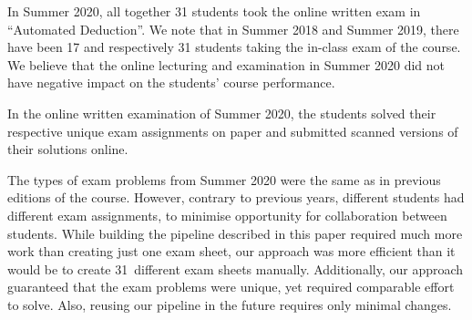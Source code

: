 In Summer 2020, all together 31 students took the online written exam
in ``Automated Deduction''. We note that in Summer 2018 and Summer
2019, there have been 17 and respectively 31 students taking
the in-class exam of the course. We believe that the
online lecturing and examination in Summer 2020 did not have negative
impact on the students' course performance.

In the online written examination of Summer 2020, the  students solved
their respective unique exam assignments on paper and submitted
scanned versions of their
solutions online. 

The types of exam problems from Summer 2020  were the same as in
previous editions of the course. 
However, contrary to previous years, different students had different exam
assignments, to minimise opportunity for collaboration between students.
%
While building the pipeline described in this paper required much more work
than creating just one exam sheet, our approach was more efficient than
it would be to create 31~different exam sheets manually. Additionally,
our approach guaranteed that the exam problems were
unique, yet required comparable effort to solve.
Also, reusing our pipeline in the future requires only minimal changes.

